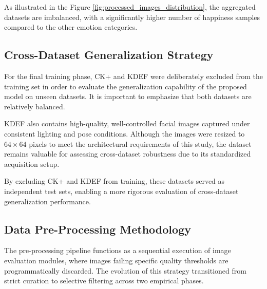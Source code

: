 As illustrated in the Figure \ref{fig:processed_images_distribution}, the aggregated datasets are imbalanced, with a significantly higher number of happiness samples compared to the other emotion categories.

\subsection{Cross-Dataset Generalization Strategy}

For the final training phase, CK+ and KDEF \cite{kdef} were deliberately excluded from the training set in order to evaluate the generalization capability of the proposed model on unseen datasets. It is important to emphasize that both datasets are relatively balanced.

KDEF also contains high-quality, well-controlled facial images captured under consistent lighting and pose conditions. Although the images were resized to $64 \times 64$ pixels to meet the architectural requirements of this study, the dataset remains valuable for assessing cross-dataset robustness due to its standardized acquisition setup.

By excluding CK+ and KDEF from training, these datasets served as independent test sets, enabling a more rigorous evaluation of cross-dataset generalization performance.

\subsection{Data Pre-Processing Methodology}
The pre-processing pipeline functions as a sequential execution of image evaluation modules, where images failing specific quality thresholds are programmatically discarded. The evolution of this strategy transitioned from strict curation to selective filtering across two empirical phases.

